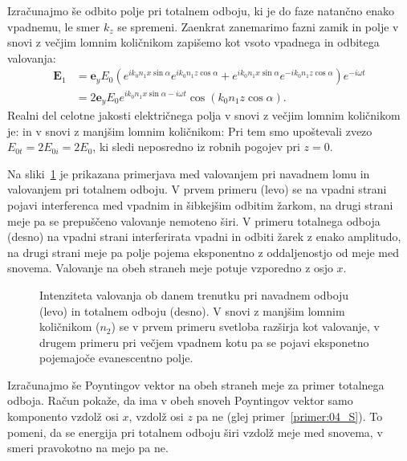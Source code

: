 Izračunajmo še odbito polje pri totalnem odboju, ki je  do faze natančno 
enako vpadnemu, le smer $k_z$ se spremeni. Zaenkrat zanemarimo fazni zamik
in polje v snovi z večjim lomnim količnikom zapišemo kot vsoto vpadnega
in odbitega valovanja:
\begin{align}
\mathbf{E}_1 &= \mathbf{e}_{y} E_{0} \left(
e^{ik_0n_1x\sin \alpha}e^{ik_0n_1z\cos \alpha}+
e^{ik_0n_1x\sin \alpha}e^{-ik_0n_1z\cos \alpha }\right) e^{-i \omega t} \nonumber\\
&= 2\mathbf{e}_{y} E_{0} e^{ik_0n_1x\sin \alpha -i\omega t} 
\cos \left(k_0 n_1z\cos \alpha \right).
 \label{eq:04_65}
\end{align}
Realni del celotne jakosti električnega polja v snovi z večjim lomnim 
količnikom je:
in v snovi z manjšim lomnim količnikom:
Pri tem smo upoštevali zvezo $E_{0t} = 2E_{0i} = 2E_0$, ki sledi neposredno iz 
robnih pogojev pri $z=0$.

Na sliki~\ref{fig:04_simulacija} je prikazana primerjava med valovanjem
pri navadnem lomu in valovanjem pri totalnem odboju. V prvem primeru (levo) se
na vpadni strani pojavi interferenca med
vpadnim in šibkejšim odbitim žarkom, na drugi strani meje pa se prepuščeno valovanje nemoteno
širi. V primeru totalnega odboja (desno) na vpadni strani interferirata 
vpadni in odbiti žarek z enako amplitudo, na drugi strani meje pa polje pojema 
eksponentno z oddaljenostjo od meje med snovema. Valovanje na obeh straneh meje
potuje vzporedno z osjo $x$. 
\begin{figure}[ht]
\centering
\def\svgwidth{140truemm} 

\caption{Intenziteta valovanja ob 
danem trenutku pri navadnem odboju (levo) in totalnem odboju (desno).
V snovi z manjšim lomnim količnikom ($n_2$) se v prvem primeru svetloba razširja
kot valovanje, v drugem primeru pri večjem vpadnem kotu pa se pojavi eksponetno pojemajoče evanescentno
polje.}
\label{fig:04_simulacija}
\end{figure}

Izračunajmo še Poyntingov vektor na obeh straneh meje za primer totalnega odboja. 
Račun pokaže, da ima v obeh snoveh Poyntingov vektor samo komponento vzdolž osi $x$,
vzdolž osi $z$ pa ne (glej primer~\ref{primer:04_S}). To pomeni, da se energija pri totalnem odboju širi 
vzdolž meje med snovema, v smeri pravokotno na mejo pa ne.  

